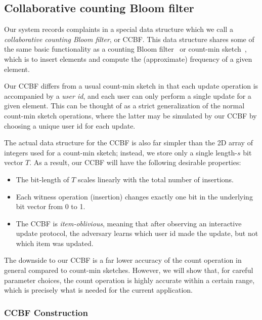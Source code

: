 \subsection{Collaborative counting Bloom filter}\label{sec:ccbf}

Our system records complaints in a special data structure which we
call a \emph{collaborative counting Bloom filter}, or CCBF. This data structure
shares some of the same basic functionality as a counting Bloom filter~\cite{TON:FCAB00, PODC:Mitzenmacher01} or count-min sketch~\cite{JAL:CorMut05}, which is to insert elements and
compute the (approximate) frequency of a given element.

Our CCBF differs from a usual count-min sketch in that each update
operation is accompanied by a \emph{user id}, and each user can only perform
a single update for a given element. This can be thought of as a strict generalization
of the normal count-min sketch operations, where the latter may be simulated by our
CCBF by choosing a unique user id for each update.

The actual data structure for the CCBF is also far simpler than the 2D array
of integers used for a count-min sketch; instead, we store only a single length-$s$
bit vector $T$. As a result, our CCBF will have the following desirable properties:

\begin{itemize}
    \item The bit-length of $T$ scales linearly with the total
    number of insertions.
    \item Each witness operation (insertion) changes exactly one bit in the underlying
    bit vector from 0 to 1.
    \item The CCBF is \emph{item-oblivious}, meaning that after observing
    an interactive update protocol, the adversary learns which user id made the update,
    but not which item was updated.
\end{itemize}

The downside to our CCBF is a far lower accuracy of the count operation in general compared to count-min sketches.
However, we will show that, for careful parameter choices, the count operation is highly
accurate within a certain range, which is precisely what is needed for the
current application.

\subsubsection{CCBF Construction}

